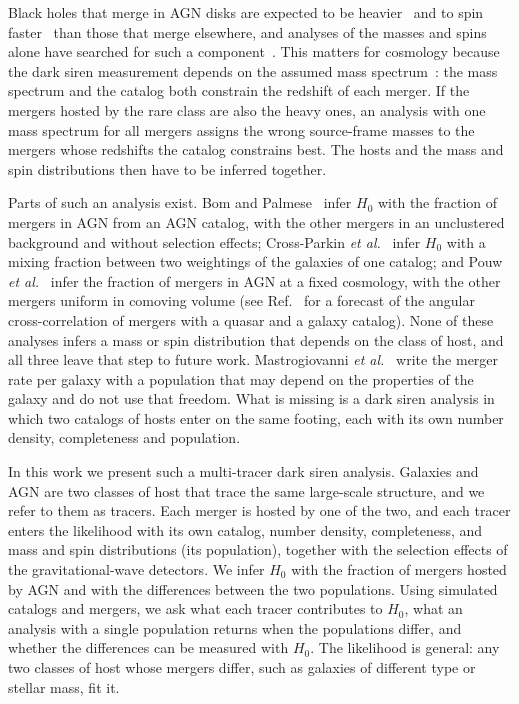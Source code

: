 \documentclass[aps,prd,reprint,amsmath,amssymb,nofootinbib]{revtex4-2}
\begin{document}
Black holes that merge in AGN disks are expected to be heavier~\cite{Yang:2019okq,Yang:2019cbr,Tagawa:2021ofj} and to spin faster~\cite{Yang:2019cbr,Tagawa:2020dxe,McKernan:2021nwk,Bartos:2026xlt} than those that merge elsewhere, and analyses of the masses and spins alone have searched for such a component~\cite{Gayathri:2021xwb,Gayathri:2023bha,Li:2025iux}.
This matters for cosmology because the dark siren measurement depends on the assumed mass spectrum~\cite{Mastrogiovanni:2021wsd,Pierra:2023deu}: the mass spectrum and the catalog both constrain the redshift of each merger.
If the mergers hosted by the rare class are also the heavy ones, an analysis with one mass spectrum for all mergers assigns the wrong source-frame masses to the mergers whose redshifts the catalog constrains best.
The hosts and the mass and spin distributions then have to be inferred together.

Parts of such an analysis exist.
Bom and Palmese~\cite{Bom:2023zgw} infer $H_0$ with the fraction of mergers in AGN from an AGN catalog, with the other mergers in an unclustered background and without selection effects; Cross-Parkin \textit{et al.}~\cite{Cross-Parkin:2026pua} infer $H_0$ with a mixing fraction between two weightings of the galaxies of one catalog; and Pouw \textit{et al.}~\cite{Pouw:2026lar} infer the fraction of mergers in AGN at a fixed cosmology, with the other mergers uniform in comoving volume (see Ref.~\cite{Moncrieff:2025xle} for a forecast of the angular cross-correlation of mergers with a quasar and a galaxy catalog).
None of these analyses infers a mass or spin distribution that depends on the class of host, and all three leave that step to future work.
Mastrogiovanni \textit{et al.}~\cite{Mastrogiovanni:2023emh} write the merger rate per galaxy with a population that may depend on the properties of the galaxy and do not use that freedom.
What is missing is a dark siren analysis in which two catalogs of hosts enter on the same footing, each with its own number density, completeness and population.

In this work we present such a multi-tracer dark siren analysis.
Galaxies and AGN are two classes of host that trace the same large-scale structure, and we refer to them as tracers.
Each merger is hosted by one of the two, and each tracer enters the likelihood with its own catalog, number density, completeness, and mass and spin distributions (its population), together with the selection effects of the gravitational-wave detectors.
We infer $H_0$ with the fraction of mergers hosted by AGN and with the differences between the two populations.
Using simulated catalogs and mergers, we ask what each tracer contributes to $H_0$, what an analysis with a single population returns when the populations differ, and whether the differences can be measured with $H_0$.
The likelihood is general: any two classes of host whose mergers differ, such as galaxies of different type or stellar mass, fit it.
\end{document}
